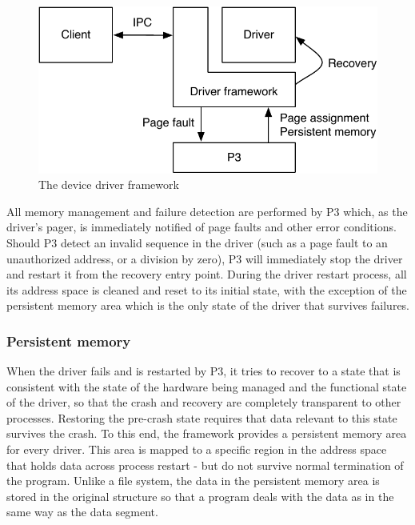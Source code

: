 \documentclass{acm_proc_article-sp}
\begin{document}
\begin{figure}[ht]
\centering
\includegraphics[scale=0.6]{figures/framework}
\caption{The device driver framework}
\label{fig:fw}
\end{figure}

All memory management and failure detection are performed by P3 which, as the driver's pager, is immediately notified of page faults and other error conditions. Should P3 detect an invalid sequence in the driver (such as a page fault to an unauthorized address, or a division by zero), P3 will immediately stop the driver and restart it from the recovery entry point. During the driver restart process, all its address space is cleaned and reset to its initial state, with the exception of the persistent memory area which is the only state of the driver that survives failures.

\subsubsection{Persistent memory}

When the driver fails and is restarted by P3, it tries to recover to a state that is consistent with the state of the hardware being managed and the functional state of the driver, so that the crash and recovery are completely transparent to other processes. Restoring the pre-crash state requires that data relevant to this state survives the crash. To this end, the framework provides a persistent memory area for every driver.  This area is mapped to a specific region in the address space that holds data across process restart - but do not survive normal termination of the program.  Unlike a file system, the data in the persistent memory area is stored in the original structure so that a program deals with the data as in the same way as the data segment.
\end{document}
